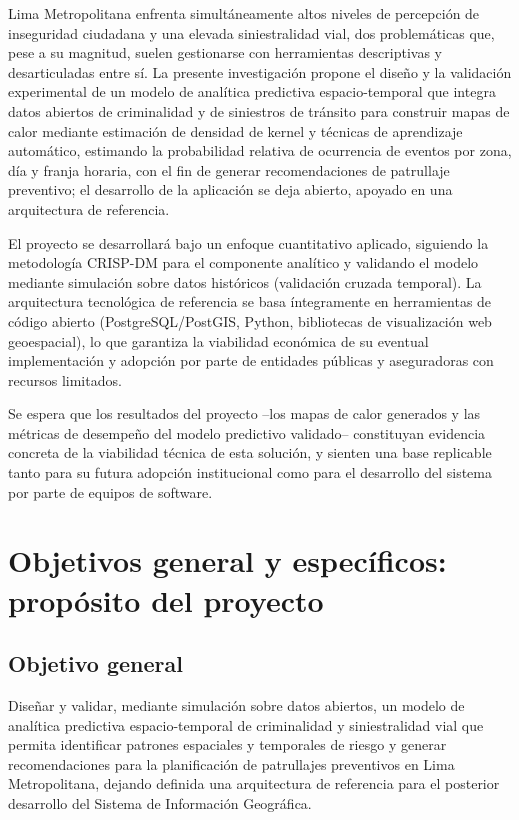 \documentclass[12pt,letterpaper]{report}
\begin{document}
Lima Metropolitana enfrenta simult\'aneamente altos niveles de percepci\'on de inseguridad ciudadana y una elevada siniestralidad vial, dos problem\'aticas que, pese a su magnitud, suelen gestionarse con herramientas descriptivas y desarticuladas entre s\'i. La presente investigaci\'on propone el dise\~no y la validaci\'on experimental de un modelo de analítica predictiva espacio-temporal que integra datos abiertos de criminalidad y de siniestros de tr\'ansito para construir mapas de calor mediante estimaci\'on de densidad de kernel y t\'ecnicas de aprendizaje autom\'atico, estimando la probabilidad relativa de ocurrencia de eventos por zona, d\'ia y franja horaria, con el fin de generar recomendaciones de patrullaje preventivo; el desarrollo de la aplicaci\'on se deja abierto, apoyado en una arquitectura de referencia.

El proyecto se desarrollar\'a bajo un enfoque cuantitativo aplicado, siguiendo la metodolog\'ia CRISP-DM para el componente anal\'itico y validando el modelo mediante simulaci\'on sobre datos hist\'oricos (validaci\'on cruzada temporal). La arquitectura tecnol\'ogica de referencia se basa \'integramente en herramientas de c\'odigo abierto (PostgreSQL/PostGIS, Python, bibliotecas de visualizaci\'on web geoespacial), lo que garantiza la viabilidad econ\'omica de su eventual implementaci\'on y adopci\'on por parte de entidades p\'ublicas y aseguradoras con recursos limitados.

Se espera que los resultados del proyecto --los mapas de calor generados y las m\'etricas de desempe\~no del modelo predictivo validado-- constituyan evidencia concreta de la viabilidad t\'ecnica de esta soluci\'on, y sienten una base replicable tanto para su futura adopci\'on institucional como para el desarrollo del sistema por parte de equipos de software.

\section{Objetivos general y espec\'ificos: prop\'osito del proyecto}

\subsection{Objetivo general}
Dise\~nar y validar, mediante simulaci\'on sobre datos abiertos, un modelo de analítica predictiva espacio-temporal de criminalidad y siniestralidad vial que permita identificar patrones espaciales y temporales de riesgo y generar recomendaciones para la planificaci\'on de patrullajes preventivos en Lima Metropolitana, dejando definida una arquitectura de referencia para el posterior desarrollo del Sistema de Informaci\'on Geogr\'afica.
\end{document}
